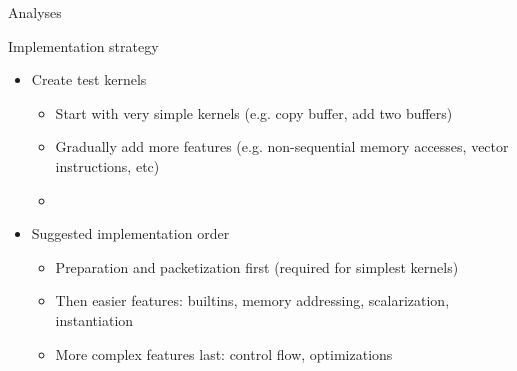 
\begin{frame}{Analyses}


\end{frame}


\begin{frame}{Implementation strategy}

\begin{itemize}
    \item Create test kernels
    \begin{itemize}
        \item Start with very simple kernels (e.g. copy buffer, add two buffers)
        \item Gradually add more features (e.g. non-sequential memory accesses, vector instructions, etc)
        \item
    \end{itemize}

    
    \item Suggested implementation order
    \begin{itemize}
        \item Preparation and packetization first (required for simplest kernels)
        \item Then easier features: builtins, memory addressing, scalarization, instantiation
        \item More complex features last: control flow, optimizations
    \end{itemize}
\end{itemize}

\end{frame}



